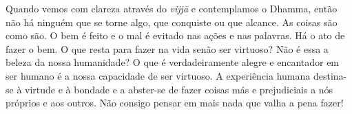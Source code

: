 Quando vemos com clareza através do \emph{vijjā} e contemplamos o Dhamma, então
não há ninguém que se torne algo, que conquiste ou que alcance. As coisas são
como são. O bem é feito e o mal é evitado nas ações e nas palavras. Há o ato de
fazer o bem. O que resta para fazer na vida senão ser virtuoso? Não é essa a
beleza da nossa humanidade? O que é verdadeiramente alegre e encantador em ser
humano é a nossa capacidade de ser virtuoso. A experiência humana destina-se à
virtude e à bondade e a abster-se de fazer coisas más e prejudiciais a nós
próprios e aos outros. Não consigo pensar em mais nada que valha a pena fazer!

